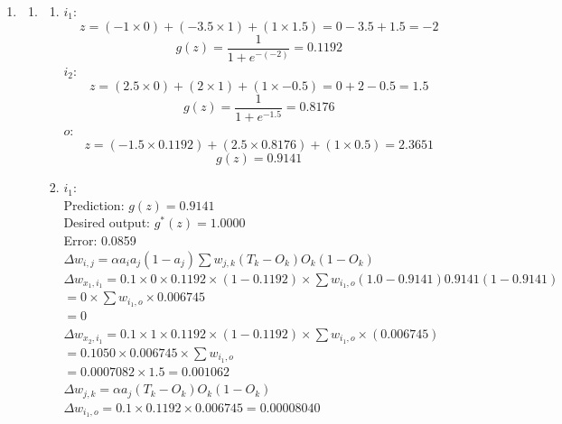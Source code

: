 \documentclass[12pt]{article}
\begin{document}
\fancyhfoffset[L]{0cm}
\fancyhfoffset[R]{0cm}


\begin{enumerate}
    \setcounter{enumi}{0}
    \item
    \begin{enumerate}
        \item
        \begin{enumerate}
            \item
            $i_1$:
                $$z = (-1\times0) + (-3.5\times1) + (1\times1.5) = 0 -3.5 + 1.5 = -2$$
                $$g(z) = \frac{1}{1 + e^{-(-2)}} = 0.1192$$
            $i_2$:
                $$z = (2.5\times0) + (2\times1) + (1\times-0.5) = 0 + 2 - 0.5 = 1.5$$
                $$g(z) = \frac{1}{1+e^{-1.5}} = 0.8176$$
            $o$:
                $$z = (-1.5\times0.1192) + (2.5\times0.8176) + (1\times0.5) = 2.3651$$
                $$g(z) = 0.9141$$
            \item
                $i_1$:\\
                Prediction: $g(z) = 0.9141$\\
                Desired output: $g^*(z) = 1.0000$\\
                Error: 0.0859\\
                $\Delta w_{i,j} = \alpha a_i a_j (1-a_j) \sum w_{j,k} (T_k - O_k) O_k (1-O_k)$\\
                $\Delta w_{x_1,i_1} = 0.1 \times 0 \times 0.1192 \times (1-0.1192) \times \sum w_{i_1,o} (1.0 - 0.9141) 0.9141 (1-0.9141)$\\
                $ = 0 \times \sum w_{i_1,o} \times 0.006745$\\
                $ = 0$\\
                $\Delta w_{x_2,i_1} = 0.1 \times 1 \times 0.1192 \times (1-0.1192) \times \sum w_{i_1,o} \times (0.006745)$\\
                $ = 0.1050 \times 0.006745 \times \sum w_{i_1,o}$\\
                $ = 0.0007082 \times 1.5 = 0.001062$\\
                $\Delta w_{j,k} = \alpha a_j (T_k - O_k) O_k (1-O_k)$\\
                $\Delta w_{i_1,o} = 0.1 \times 0.1192 \times 0.006745 = 0.00008040$\\

\end{enumerate}
\end{enumerate}
\end{enumerate}
\end{document}
